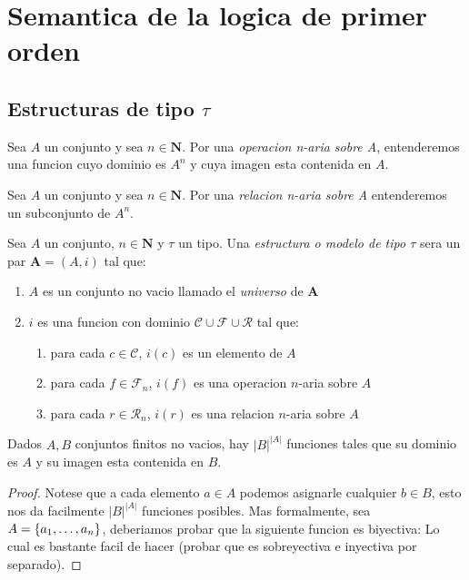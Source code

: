 \section{Semantica de la logica de primer orden}

\subsection{Estructuras de tipo $\tau$}
\begin{definition}
  Sea $A$ un conjunto y sea $n \in \mathbf{N}$. Por una \emph{operacion n-aria sobre A}, entenderemos
  una funcion cuyo dominio es $A^n$ y cuya imagen esta contenida en $A$.
\end{definition}

\begin{definition}
  Sea $A$ un conjunto y sea $n \in \mathbf{N}$. Por una \emph{relacion n-aria sobre A} entenderemos un subconjunto de $A^n$.
\end{definition}

\begin{definition}
  Sea $A$ un conjunto, $n \in \mathbf{N}$ y $\tau$ un tipo. Una \emph{estructura o modelo de tipo $\tau$} sera un par $\mathbf{A} = (A, i)$ tal que:
  \begin{enumerate}
    \item $A$ es un conjunto no vacio llamado el \emph{universo} de $\mathbf{A}$
    \item $i$ es una funcion con dominio $\mathcal{C} \cup \mathcal{F} \cup \mathcal{R}$ tal que: \begin{enumerate}
      \item para cada $c \in \mathcal{C}$, $i(c)$ es un elemento de $A$
      \item para cada $f \in \mathcal{F}_n$, $i(f)$ es una operacion $n$-aria sobre $A$
      \item para cada $r \in \mathcal{R}_n$, $i(r)$ es una relacion $n$-aria sobre $A$
    \end{enumerate}
  \end{enumerate}
\end{definition}

\begin{lemma}
  Dados $A, B$ conjuntos finitos no vacios, hay $|B|^{|A|}$ funciones tales que su dominio es $A$ y 
  su imagen esta contenida en $B$.
\end{lemma}
\begin{proof}
  Notese que a cada elemento $a\in A$ podemos asignarle cualquier $b\in B$, esto nos da facilmente $|B|^{|A|}$ funciones posibles.
  Mas formalmente, sea $A = \{a_{1}, \dots, a_{n}\}$, deberiamos probar que la siguiente funcion es biyectiva:
  Lo cual es bastante facil de hacer (probar que es sobreyectiva e inyectiva por separado).
\end{proof}

